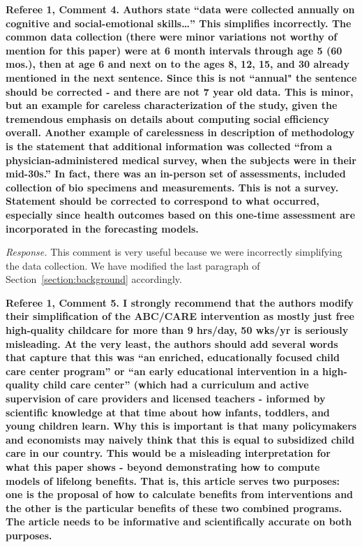 \noindent \textbf{Referee 1, Comment 4. Authors state ``data were collected annually on cognitive and social-emotional skills…'' This simplifies incorrectly. The common data collection (there were minor variations not worthy of mention for this paper) were at 6 month intervals through age 5 (60 mos.), then at age 6 and next on to the ages 8, 12, 15, and 30 already mentioned in the next sentence. Since this is not ``annual" the sentence should be corrected - and there are not 7 year old data. This is minor, but an example for careless characterization of the study, given the tremendous emphasis on details about computing social efficiency overall. Another example of carelessness in description of methodology is the statement that additional information was collected ``from a physician-administered medical survey, when the subjects were in their mid-30s.'' In fact, there was an in-person set of assessments, included collection of bio specimens and measurements. This is not a survey. Statement should be corrected to correspond to what occurred, especially since health outcomes based on this one-time assessment are incorporated in the forecasting models.} 

\noindent \textit{Response.} This comment is very useful because we were incorrectly simplifying the data collection. We have modified the last paragraph of Section~\ref{section:background} accordingly.

\noindent \textbf{Referee 1, Comment 5. I strongly recommend that the authors modify their simplification of the ABC/CARE intervention as mostly just free high-quality childcare for more than 9 hrs/day, 50 wks/yr is seriously misleading. At the very least, the authors should add several words that capture that this was ``an enriched, educationally focused child care center program'' or ``an early educational intervention in a high-quality child care center'' (which had a curriculum and active supervision of care providers and licensed teachers - informed by scientific knowledge at that time about how infants, toddlers, and young children learn. Why this is important is that many policymakers and economists may naively think that this is equal to subsidized child care in our country. This would be a misleading interpretation for what this paper shows - beyond demonstrating how to compute models of lifelong benefits. That is, this article serves two purposes: one is the proposal of how to calculate benefits from interventions and the other is the particular benefits of these two combined programs. The article needs to be informative and scientifically accurate on both purposes.}

